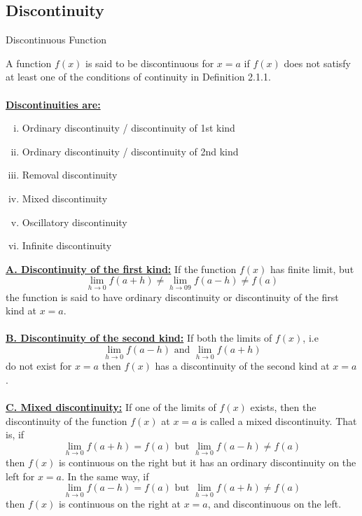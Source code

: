 
\subsection{Discontinuity}

\begin{definition}{Discontinuous Function}
    
    A function $f(x)$ is said to be discontinuous for $x=a$ if $f(x)$ does not satisfy at least one of the conditions of continuity in Definition 2.1.1. \\~\\

    \underline{\textbf{Discontinuities are:}}
    \begin{enumerate}[(i)]
        \item Ordinary discontinuity / discontinuity of 1st kind
        \item Ordinary discontinuity / discontinuity of 2nd kind
        \item Removal discontinuity
        \item Mixed discontinuity
        \item Oscillatory discontinuity
        \item Infinite discontinuity
    \end{enumerate}
\end{definition}\vspace{5mm}

\underline{\textbf{A. Discontinuity of the first kind:}}
If the function $f(x)$ has finite limit, but  \[
    \lim_{h \to 0} f(a+h) \neq \lim_{h \to 09} f(a-h) \neq f(a)
\] the function is said to have ordinary discontinuity or discontinuity of the first kind at $x=a$. \\~\\

\underline{\textbf{B. Discontinuity of the second kind:}}
If both the limits of $f(x)$, i.e \[
    \lim_{h \to 0} f(a-h) \text{ and } \lim_{h \to 0} f(a+h)
\] do not exist for $x=a$ then $f(x)$ has a discontinuity of the second kind at $x=a$. \\~\\

\underline{\textbf{C. Mixed discontinuity:}}
If one of the limits of $f(x)$ exists, then the discontinuity of the function $f(x)$ at $x=a$ is called a mixed discontinuity. That is, if \[
    \lim_{h \to 0} f(a+h) = f(a) \text{ but } \lim_{h \to 0} f(a-h) \neq f(a)
\] then $f(x)$ is continuous on the right but it has an ordinary discontinuity on the left for $x=a$. In the same way, if \[
     \lim_{h \to 0} f(a-h) = f(a) \text{ but } \lim_{h \to 0} f(a+h) \neq  f(a)
\] then $f(x)$ is continuous on the right at $x=a$, and discontinuous on the left. \\~\\

